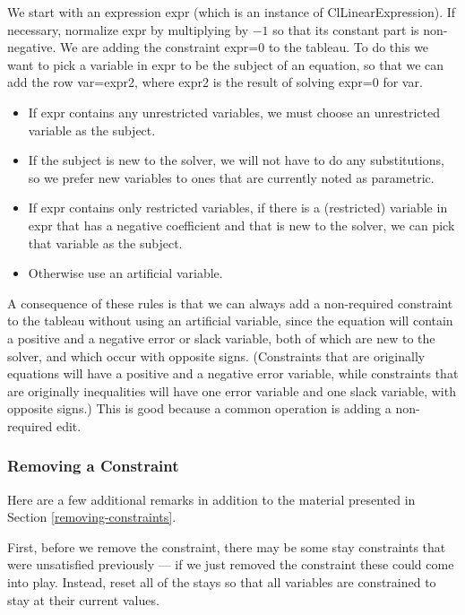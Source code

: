 \documentclass{article}
\begin{document}
We start with an expression {\sf expr} (which is an instance of {\sf
ClLinearExpression}).  If necessary, normalize {\sf expr} by multiplying by
$-1$ so that its constant part is non-negative.  We are adding the
constraint {\sf expr=0} to the tableau.  To do this we want to pick a
variable in {\sf expr} to be the subject of an equation, so that we can add
the row {\sf var=expr2}, where {\sf expr2} is the result of solving {\sf
expr=0} for {\sf var}.

\begin{itemize}

\item If {\sf expr} contains any unrestricted variables, we must choose an
unrestricted variable as the subject.

\item If the subject is new to the solver, we will not have to do any
substitutions, so we prefer new variables to ones that are currently noted
as parametric.  

\item If {\sf expr} contains only restricted variables, if there is a
(restricted) variable in {\sf expr} that has a negative coefficient and
that is new to the solver, we can pick that variable as the subject.

\item Otherwise use an artificial variable.

\end{itemize}

A consequence of these rules is that we can always add a non-required
constraint to the tableau without using an artificial variable, since the
equation will contain a positive and a negative error 
or slack variable, both of
which are new to the solver, and which occur with opposite signs.  
(Constraints that are originally equations will have a positive and
a negative error variable, while constraints that are originally inequalities
will have one error variable and one slack variable, with opposite signs.)  This is
good because a common operation is adding a non-required edit.

\subsubsection{Removing a Constraint}

Here are a few additional remarks in addition to the material presented in
Section \ref{removing-constraints}.  

First, before we remove the constraint, there may be some stay constraints
that were unsatisfied previously --- if we just removed the constraint
these could come into play.  Instead, reset all of the stays so that all
variables are constrained to stay at their current values.
\end{document}
